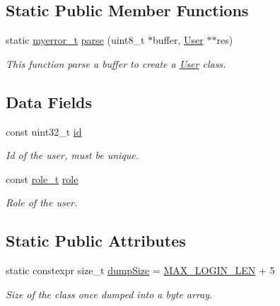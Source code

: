 \subsection*{Static Public Member Functions}
\begin{DoxyCompactItemize}
\item 
static \hyperlink{error_8hpp_acabd2917084445509becf54ab64a4bd0}{myerror\+\_\+t} \hyperlink{classUser_a51db3d6d7dc0bdcc88e1e68acdd43dfd}{parse} (uint8\+\_\+t $\ast$buffer, \hyperlink{classUser}{User} $\ast$$\ast$res)
\begin{DoxyCompactList}\small\item\em This function parse a buffer to create a \hyperlink{classUser}{User} class. \end{DoxyCompactList}\end{DoxyCompactItemize}
\subsection*{Data Fields}
\begin{DoxyCompactItemize}
\item 
\hypertarget{classUser_aa968324a879499589f584dc6f3c6a6e2}{}const uint32\+\_\+t \hyperlink{classUser_aa968324a879499589f584dc6f3c6a6e2}{id}\label{classUser_aa968324a879499589f584dc6f3c6a6e2}

\begin{DoxyCompactList}\small\item\em Id of the user, must be unique. \end{DoxyCompactList}\item 
\hypertarget{classUser_a9b04781b4e2bcd9f76deed61ba326237}{}const \hyperlink{user_8hpp_a147824aa4797bb7a9bcf276b5de0cb7c}{role\+\_\+t} \hyperlink{classUser_a9b04781b4e2bcd9f76deed61ba326237}{role}\label{classUser_a9b04781b4e2bcd9f76deed61ba326237}

\begin{DoxyCompactList}\small\item\em Role of the user. \end{DoxyCompactList}\end{DoxyCompactItemize}
\subsection*{Static Public Attributes}
\begin{DoxyCompactItemize}
\item 
\hypertarget{classUser_ab8a359b3a7b3c51013dd461b1120df4d}{}static constexpr size\+\_\+t \hyperlink{classUser_ab8a359b3a7b3c51013dd461b1120df4d}{dump\+Size} = \hyperlink{user_8hpp_a43842dcd60d621d7d9c9b9e4ecd76f78}{M\+A\+X\+\_\+\+L\+O\+G\+I\+N\+\_\+\+L\+E\+N} + 5\label{classUser_ab8a359b3a7b3c51013dd461b1120df4d}

\begin{DoxyCompactList}\small\item\em Size of the class once dumped into a byte array. \end{DoxyCompactList}\end{DoxyCompactItemize}
